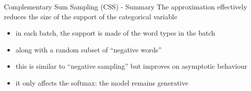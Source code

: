 \begin{frame}{Complementary Sum Sampling (CSS) - Summary}
The approximation effectively reduces the size of the support of the categorical variable
\begin{itemize}
	\item in each batch, the support is made of the word types in the batch
	\item along with a random subset of ``negative words''
	\item this is similar to ``negative sampling'' but improves on asymptotic behaviour
	\item it only affects the softmax: the model remains generative
\end{itemize}

\end{frame}


